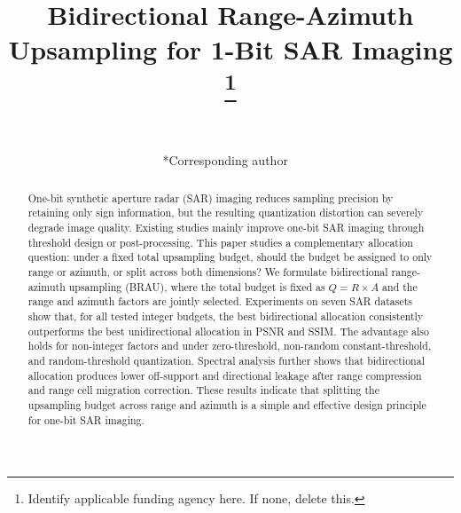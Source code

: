 \documentclass[conference]{IEEEtran}
\begin{document}
\title{Bidirectional Range-Azimuth Upsampling for 1-Bit SAR Imaging
\thanks{Identify applicable funding agency here. If none, delete this.}
}

\author{
~\\
\and
{}
*Corresponding author
~\\
\and
{}
}

\maketitle

\begin{abstract}
One-bit synthetic aperture radar (SAR) imaging reduces sampling precision by retaining only sign information, but the resulting quantization distortion can severely degrade image quality. Existing studies mainly improve one-bit SAR imaging through threshold design or post-processing. This paper studies a complementary allocation question: under a fixed total upsampling budget, should the budget be assigned to only range or azimuth, or split across both dimensions? We formulate bidirectional range-azimuth upsampling (BRAU), where the total budget is fixed as $Q=R\times A$ and the range and azimuth factors are jointly selected. Experiments on seven SAR datasets show that, for all tested integer budgets, the best bidirectional allocation consistently outperforms the best unidirectional allocation in PSNR and SSIM. The advantage also holds for non-integer factors and under zero-threshold, non-random constant-threshold, and random-threshold quantization. Spectral analysis further shows that bidirectional allocation produces lower off-support and directional leakage after range compression and range cell migration correction. These results indicate that splitting the upsampling budget across range and azimuth is a simple and effective design principle for one-bit SAR imaging.
\end{abstract}
\end{document}
